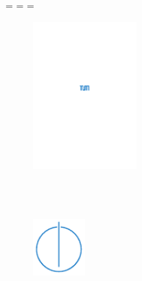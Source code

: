 \begin{titlepage}
\begin{center}
  \oddsidemargin=\evensidemargin\relax
  \textwidth=\dimexpr{}\evensidemargin-2in\relax
  \hsize=\textwidth\relax


  \vspace{40mm}
  \begin{figure}
	\centering
	\hspace{15mm}
		\includegraphics[width=40mm]{logos/tum.pdf}
  \end{figure}
  

  \vspace{5mm}
  {\huge\MakeUppercase{\getFaculty{}}}\\

  \vspace{5mm}
  {\large\MakeUppercase{\getUniversity{}}}\\

  \vspace{20mm}
  {\Large \getDoctype{}}

  \vspace{15mm}
  {\huge\bfseries \getTitle{}}

  \vspace{15mm}
  {\LARGE \getAuthor{}}

  \vspace{20mm}
	
  \begin{figure}[h]
	\centering
	\hspace{40mm}
		\includegraphics[width=20mm]{logos/faculty.pdf}
  \end{figure}
  
	 \end{center}
\end{titlepage}
